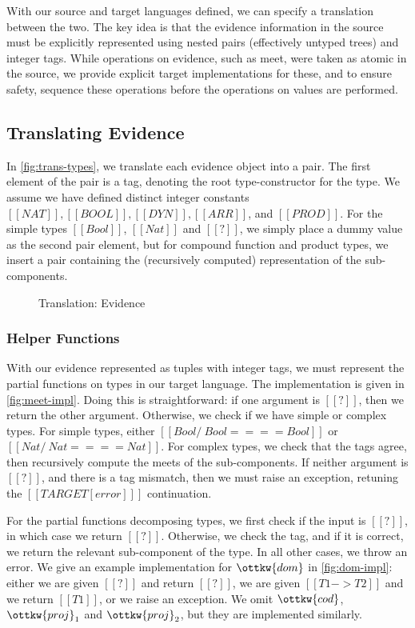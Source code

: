 \documentclass[11pt]{article}
\begin{document}
With our source and target languages defined, we can specify a translation between the two.
The key idea is that the evidence information in the source must be explicitly represented
using nested pairs (effectively untyped trees) and integer tags. While operations on evidence,
such as meet, were taken as atomic in the source, we provide explicit target implementations for these,
and to ensure safety, sequence these operations before the operations on values are performed.

\subsection{Translating Evidence} 

In \autoref{fig:trans-types}, we translate each evidence object into a pair.
The first element of the pair is a tag, denoting the root type-constructor for the type.
We assume we have defined distinct integer constants $[[NAT]], [[BOOL]], [[DYN]], [[ARR]]$, and $[[PROD]]$.
For the simple types $[[Bool]]$, $[[Nat]]$ and $[[?]]$, we simply place a dummy value as the second pair element,
but for compound function and product types, we insert a pair containing the (recursively computed) representation
of the sub-components.              

\begin{figure}[H]  
	\ottdefnEvTransform
	\caption{Translation: Evidence}
	\label{fig:trans-types}
\end{figure} 

\subsubsection{Helper Functions}

With our evidence represented as tuples with integer tags, we must represent the partial functions
on types in our target language.
The implementation is given in \autoref{fig:meet-impl}. 
Doing this is straightforward: if one argument is $[[?]]$,
then we return the other argument. Otherwise, we check if we have simple or complex types.
For simple types, either $[[Bool /\ Bool ==== Bool]]$ or $[[Nat /\ Nat ==== Nat]]$.
For complex types, we check that the tags agree, then recursively compute the meets of the sub-components.
If neither argument is $[[?]]$, and there is a tag mismatch, then we must raise an exception, retuning the $[[ TARGET[error] ]]$
continuation.

For the partial functions decomposing types, we first check if the input is $[[?]]$,
in which case we return $[[?]]$. Otherwise, we check the tag, and if it is correct, we return
the relevant sub-component of the type. In all other cases, we throw an error.
We give an example implementation for $\ottkw{dom}$ in \autoref{fig:dom-impl}: either we are given $[[?]]$
and return $[[?]]$, we are given $[[T1 -> T2]]$ and we return $[[T1]]$, or we raise an exception.
We omit $\ottkw{cod}$, $\ottkw{proj}_1$ and $\ottkw{proj}_2$, but they are implemented similarly.
\end{document}
